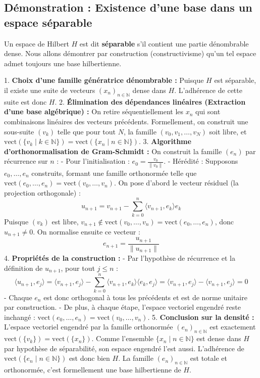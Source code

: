 \documentclass[11pt,a4paper]{article}
\begin{document}
\subsection{Démonstration : Existence d'une base dans un espace séparable}

Un espace de Hilbert $H$ est dit \textbf{séparable} s'il contient une partie dénombrable dense. Nous allons démontrer par construction (constructivisme) qu'un tel espace admet toujours une base hilbertienne.

1. \textbf{Choix d'une famille génératrice dénombrable :}
   Puisque $H$ est séparable, il existe une suite de vecteurs $(x_n)_{n \in \mathbb{N}}$ dense dans $H$. L'adhérence de cette suite est donc $H$.
2. \textbf{Élimination des dépendances linéaires (Extraction d'une base algébrique) :}
   On retire séquentiellement les $x_n$ qui sont combinaisons linéaires des vecteurs précédents. Formellement, on construit une sous-suite $(v_k)$ telle que pour tout $N$, la famille $(v_0, v_1, \dots, v_N)$ soit libre, et $\text{vect}(\{v_k \mid k \in \mathbb{N}\}) = \text{vect}(\{x_n \mid n \in \mathbb{N}\})$.
3. \textbf{Algorithme d'orthonormalisation de Gram-Schmidt :}
   On construit la famille $(e_n)$ par récurrence sur $n$ :
   - Pour l'initialisation : $e_0 = \frac{v_0}{\|v_0\|}$.
   - Hérédité : Supposons $e_0, \dots, e_n$ construits, formant une famille orthonormée telle que $\text{vect}(e_0, \dots, e_n) = \text{vect}(v_0, \dots, v_n)$.
   On pose d'abord le vecteur résiduel (la projection orthogonale) :
   $$ u_{n+1} = v_{n+1} - \sum_{k=0}^n \langle v_{n+1}, e_k \rangle e_k $$
   Puisque $(v_k)$ est libre, $v_{n+1} \notin \text{vect}(v_0, \dots, v_n) = \text{vect}(e_0, \dots, e_n)$, donc $u_{n+1} \neq 0$.
   On normalise ensuite ce vecteur :
   $$ e_{n+1} = \frac{u_{n+1}}{\|u_{n+1}\|} $$
4. \textbf{Propriétés de la construction :}
   - Par l'hypothèse de récurrence et la définition de $u_{n+1}$, pour tout $j \leq n$ :
     $$ \langle u_{n+1}, e_j \rangle = \langle v_{n+1}, e_j \rangle - \sum_{k=0}^n \langle v_{n+1}, e_k \rangle \langle e_k, e_j \rangle = \langle v_{n+1}, e_j \rangle - \langle v_{n+1}, e_j \rangle = 0 $$
   - Chaque $e_n$ est donc orthogonal à tous les précédents et est de norme unitaire par construction.
   - De plus, à chaque étape, l'espace vectoriel engendré reste inchangé : $\text{vect}(e_0, \dots, e_n) = \text{vect}(v_0, \dots, v_n)$.
5. \textbf{Conclusion sur la densité :}
   L'espace vectoriel engendré par la famille orthonormée $(e_n)_{n \in \mathbb{N}}$ est exactement $\text{vect}(\{v_k\}) = \text{vect}(\{x_n\})$.
   Comme l'ensemble $\{x_n \mid n \in \mathbb{N}\}$ est dense dans $H$ par hypothèse de séparabilité, son espace engendré l'est aussi.
   L'adhérence de $\text{vect}(\{e_n \mid n \in \mathbb{N}\})$ est donc bien $H$.
   La famille $(e_n)_{n \in \mathbb{N}}$ est totale et orthonormée, c'est formellement une base hilbertienne de $H$.
\end{document}
